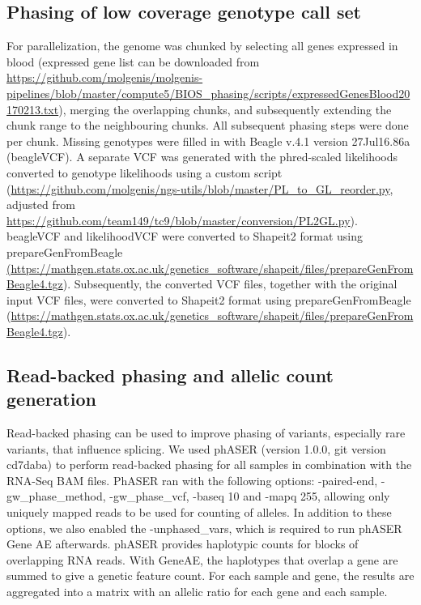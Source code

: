 \subsection{Phasing of low coverage genotype call set}
For parallelization, the genome was chunked by selecting all genes expressed in blood (expressed gene list can be downloaded from \url{https://github.com/molgenis/molgenis-pipelines/blob/master/compute5/BIOS\_phasing/scripts/expressedGenesBlood20170213.txt}), merging the overlapping chunks, and subsequently extending the chunk range to the neighbouring chunks. All subsequent phasing steps were done per chunk. Missing genotypes were filled in with Beagle\cite{browningGenotypeImputationMillions2016} v.4.1 version 27Jul16.86a (beagleVCF). A separate VCF was generated with the phred-scaled likelihoods converted to genotype likelihoods using a custom script (\url{https://github.com/molgenis/ngs-utils/blob/master/PL\_to\_GL\_reorder.py}, adjusted from \url{https://github.com/team149/tc9/blob/master/conversion/PL2GL.py}). beagleVCF and likelihoodVCF were converted to Shapeit2 format using prepareGenFromBeagle \url{(https://mathgen.stats.ox.ac.uk/genetics\_software/shapeit/files/prepareGenFromBeagle4.tgz}). Subsequently, the converted VCF files, together with the original input VCF files, were converted to Shapeit2 format using prepareGenFromBeagle (\url{https://mathgen.stats.ox.ac.uk/genetics\_software/shapeit/files/prepareGenFromBeagle4.tgz}).
	
\subsection{Read-backed phasing and allelic count generation}
Read-backed phasing can be used to improve phasing of variants, especially rare variants, that influence splicing. We used phASER\cite{castelRareVariantPhasing2016} (version 1.0.0, git version cd7daba) to perform read-backed phasing for all samples in combination with the RNA-Seq BAM files. PhASER ran with the following options: -paired-end, -gw\_phase\_method, -gw\_phase\_vcf, -baseq 10 and -mapq 255, allowing only uniquely mapped reads to be used for counting of alleles. In addition to these options, we also enabled the -unphased\_vars, which is required to run phASER Gene AE afterwards.
phASER provides haplotypic counts for blocks of overlapping RNA reads. With GeneAE, the haplotypes that overlap a gene are summed to give a genetic feature count. For each sample and gene, the results are aggregated into a matrix with an allelic ratio for each gene and each sample. 

